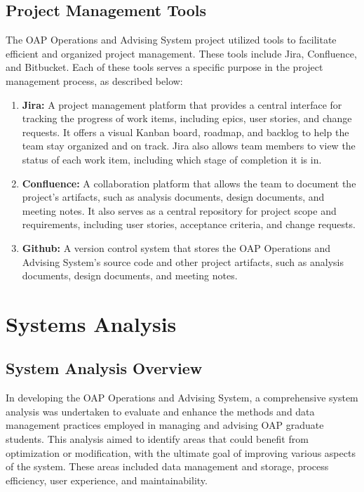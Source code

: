 \documentclass[12pt]{article}
\begin{document}
\subsection{Project Management Tools}
The OAP Operations and Advising System project utilized tools to facilitate efficient and organized project management. These tools include Jira, Confluence, and Bitbucket. Each of these tools serves a specific purpose in the project management process, as described below:

\begin{enumerate}[label=(\roman*)]
    \item \textbf{Jira:} A project management platform that provides a central interface for tracking the progress of work items, including epics, user stories, and change requests. It offers a visual Kanban board, roadmap, and backlog to help the team stay organized and on track. Jira also allows team members to view the status of each work item, including which stage of completion it is in.
    \item \textbf{Confluence:} A collaboration platform that allows the team to document the project's artifacts, such as analysis documents, design documents, and meeting notes. It also serves as a central repository for project scope and requirements, including user stories, acceptance criteria, and change requests.
    \item \textbf{Github:} A version control system that stores the OAP Operations and Advising System's source code and other project artifacts, such as analysis documents, design documents, and meeting notes.
\end{enumerate}

\section{Systems Analysis}
\subsection{System Analysis Overview}
In developing the OAP Operations and Advising System, a comprehensive system analysis was undertaken to evaluate and enhance the methods and data management practices employed in managing and advising OAP graduate students. This analysis aimed to identify areas that could benefit from optimization or modification, with the ultimate goal of improving various aspects of the system. These areas included data management and storage, process efficiency, user experience, and maintainability.
\end{document}
